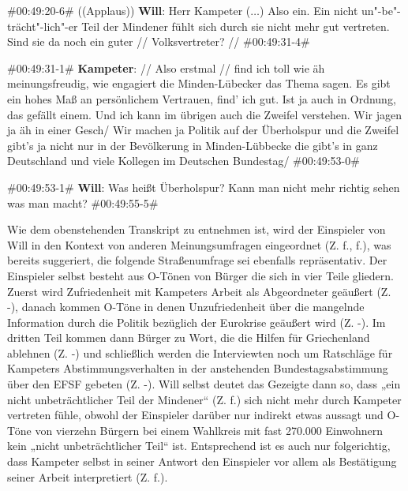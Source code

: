 \begin{description}
\begin{linenumbers}[1]
		\item \#00:49:20-6\# ((Applaus)) \textbf{Will}: Herr Kampeter ($\ldots$) Also ein. Ein nicht un"-be"-trächt"-lich"-er Teil der Mindener fühlt sich durch sie nicht mehr gut vertreten. Sind sie da noch ein guter // Volksvertreter? // \#00:49:31-4\#
		
		\item \#00:49:31-1\# \textbf{Kampeter}: // Also erstmal // find ich toll wie äh meinungsfreudig, wie engagiert die Minden-Lübecker das Thema sagen. Es gibt ein hohes Maß an persönlichem Vertrauen, find' ich gut. Ist ja auch in Ordnung, das gefällt einem. Und ich kann im übrigen auch die Zweifel verstehen. Wir jagen ja äh in einer Gesch/ Wir machen ja Politik auf der Überholspur und die Zweifel gibt's ja nicht nur in der Bevölkerung in Minden-Lübbecke die gibt’s in ganz Deutschland und viele Kollegen im Deutschen Bundestag/  \#00:49:53-0\#
		
		\item \#00:49:53-1\# \textbf{Will}: Was heißt Überholspur? Kann man nicht mehr richtig sehen was man macht?  \#00:49:55-5\#
	\end{linenumbers}
\end{description}

Wie dem obenstehenden Transkript zu entnehmen ist, wird der Einspieler von Will in den Kontext von anderen Meinungsumfragen eingeordnet (Z. f., f.), was bereits suggeriert, die folgende Straßenumfrage sei ebenfalls repräsentativ. Der Einspieler  selbst besteht aus O-Tönen von Bürger die sich in vier Teile gliedern. Zuerst wird Zufriedenheit mit Kampeters Arbeit als Abgeordneter geäußert (Z. -), danach kommen O-Töne in denen Unzufriedenheit über die mangelnde Information durch die Politik bezüglich der Eurokrise geäußert wird (Z. -). Im dritten Teil kommen dann Bürger zu Wort, die die Hilfen für Griechenland ablehnen (Z. -) und schließlich werden die Interviewten noch um Ratschläge für Kampeters Abstimmungsverhalten in der anstehenden Bundestagsabstimmung über den EFSF gebeten (Z. -). Will selbst deutet das Gezeigte dann so, dass „ein nicht unbeträchtlicher Teil der Mindener“ (Z. f.) sich nicht mehr durch Kampeter vertreten fühle, obwohl der Einspieler darüber nur indirekt etwas aussagt und O-Töne von vierzehn Bürgern bei einem Wahlkreis mit fast 270.000 Einwohnern \parencite{derbundeswahlleiterStrukturdatenWahlkreis1352009} kein „nicht unbeträchtlicher Teil“ ist. Entsprechend ist es auch nur folgerichtig, dass Kampeter selbst in seiner Antwort den Einspieler vor allem als Bestätigung seiner Arbeit interpretiert (Z. f.).

